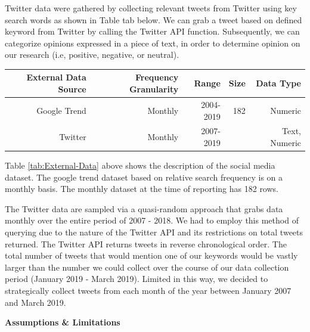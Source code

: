 \documentclass[12pt,oneside]{chicagocapstone}
\begin{document}
Twitter data were gathered by collecting relevant tweets from Twitter
using key search words as shown in Table tab below. We can grab a tweet
based on defined keyword from Twitter by calling the Twitter API
function. Subsequently, we can categorize opinions expressed in a piece
of text, in order to determine opinion on our research (i.e, positive,
negative, or neutral).
\begin{longtable}[]{@{}rrrrr@{}}
\toprule
External Data Source & Frequency Granularity & Range & Size & Data
Type\tabularnewline
\midrule
\endhead
Google Trend & Monthly & 2004-2019 & 182 & Numeric\tabularnewline
Twitter & Monthly & 2007-2019 & & Text, Numeric\tabularnewline
\bottomrule
\end{longtable}
Table \ref{tab:External-Data} above shows the description of the social
media dataset. The google trend dataset based on relative search
frequency is on a monthly basis. The monthly dataset at the time of
reporting has 182 rows.

The Twitter data are sampled via a quasi-random approach that grabs data
monthly over the entire period of 2007 - 2018. We had to employ this
method of querying due to the nature of the Twitter API and its
restrictions on total tweets returned. The Twitter API returns tweets in
reverse chronological order. The total number of tweets that would
mention one of our keywords would be vastly larger than the number we
could collect over the course of our data collection period (January
2019 - March 2019). Limited in this way, we decided to strategically
collect tweets from each month of the year between January 2007 and
March 2019.

\textbf{Assumptions \& Limitations}
\end{document}
